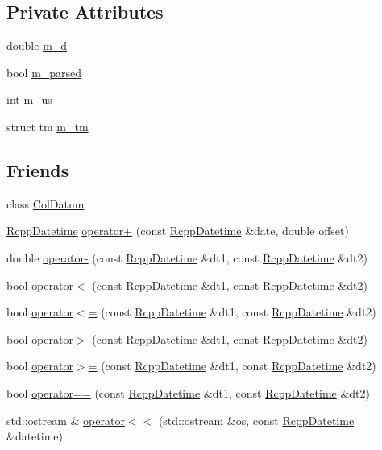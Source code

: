 \subsection*{Private Attributes}
\begin{DoxyCompactItemize}
\item 
double \hyperlink{classRcppDatetime_a1af187ff381bfa0f5b57d28b64d7b60c}{m\_\-d}
\item 
bool \hyperlink{classRcppDatetime_a515e3390c1834e58ce6bba39854638ad}{m\_\-parsed}
\item 
int \hyperlink{classRcppDatetime_a68b9c7b759ffbba14aca3ae0680ea8a4}{m\_\-us}
\item 
struct tm \hyperlink{classRcppDatetime_a3f65c708657270208656c1be885e9f1b}{m\_\-tm}
\end{DoxyCompactItemize}
\subsection*{Friends}
\begin{DoxyCompactItemize}
\item 
class \hyperlink{classRcppDatetime_a2740dcf7de2c2f5471d8fa18944a98d7}{ColDatum}
\item 
\hyperlink{classRcppDatetime}{RcppDatetime} \hyperlink{classRcppDatetime_a29513e04f8cb90b2a7efea97f8cbd37a}{operator+} (const \hyperlink{classRcppDatetime}{RcppDatetime} \&date, double offset)
\item 
double \hyperlink{classRcppDatetime_a946df17f9ce3c423518d0db74e2bbbc4}{operator-\/} (const \hyperlink{classRcppDatetime}{RcppDatetime} \&dt1, const \hyperlink{classRcppDatetime}{RcppDatetime} \&dt2)
\item 
bool \hyperlink{classRcppDatetime_a142f9346629bf7a6f673ba05d9338cf3}{operator$<$} (const \hyperlink{classRcppDatetime}{RcppDatetime} \&dt1, const \hyperlink{classRcppDatetime}{RcppDatetime} \&dt2)
\item 
bool \hyperlink{classRcppDatetime_a7d98733f95f5647ac10bb8236c1a7a8d}{operator$<$=} (const \hyperlink{classRcppDatetime}{RcppDatetime} \&dt1, const \hyperlink{classRcppDatetime}{RcppDatetime} \&dt2)
\item 
bool \hyperlink{classRcppDatetime_a062107b2e2809a60c67f80da5dab77ed}{operator$>$} (const \hyperlink{classRcppDatetime}{RcppDatetime} \&dt1, const \hyperlink{classRcppDatetime}{RcppDatetime} \&dt2)
\item 
bool \hyperlink{classRcppDatetime_a1aac48969216af0555677a43b3617781}{operator$>$=} (const \hyperlink{classRcppDatetime}{RcppDatetime} \&dt1, const \hyperlink{classRcppDatetime}{RcppDatetime} \&dt2)
\item 
bool \hyperlink{classRcppDatetime_ac6643666732e0a62c501da9f0ae9e342}{operator==} (const \hyperlink{classRcppDatetime}{RcppDatetime} \&dt1, const \hyperlink{classRcppDatetime}{RcppDatetime} \&dt2)
\item 
std::ostream \& \hyperlink{classRcppDatetime_a778b21a52b7f2b17978933c3ec27754e}{operator$<$$<$} (std::ostream \&os, const \hyperlink{classRcppDatetime}{RcppDatetime} \&datetime)
\end{DoxyCompactItemize}


